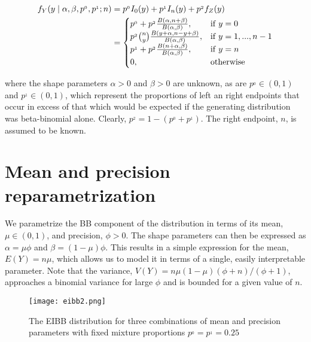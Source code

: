 \begin{equation}
\begin{split}
f_{Y}(y \mid \alpha , \beta , p^{_0}, p^{_1}; n)
&= p^{_0}I_0(y) + p^{_1}I_n(y) + p^{_2} f_{Z}(y)\\
&=	\begin{cases}
p^{_0} + p^{_2} {B(\alpha, n+\beta) \over B(\alpha,\beta)}, & \mathrm{if}\; y=0\\
p^{_2} {n \choose y} {B(y+\alpha, n-y+\beta) \over B(\alpha,\beta)}, & \mathrm{if}\; y=1,...,n-1\\
p^{_1} + p^{_2} {B(n+\alpha, \beta) \over B(\alpha,\beta)}, & \mathrm{if}\; y=n\\
0, & \mathrm{otherwise}
	\end{cases}
\end{split}
\label{densidad}
\end{equation}
	
\noindent where the shape parameters $\alpha > 0$ and $\beta > 0$ are unknown, as are $p^{_0} \in (0, 1)$ and $p^{_1} \in (0, 1)$, which represent the proportions of left an right endpoints that occur in excess of that which would be expected if the generating distribution was beta-binomial alone. Clearly, $p^{_2} = 1 -  (p^{_0}+p^{_1})$.  The right endpoint, $n$, is assumed to be known.\\

\section{Mean and precision reparametrization}
\label{sec:reparam}

We parametrize the BB component of the distribution in terms of its mean, $\mu \in (0,1)$, and precision, $\phi > 0$. The shape parameters can then be expressed as $\alpha = \mu\phi$ and $\beta = (1-\mu)\phi$. This results in a simple expression for the mean, $E(Y) = n\mu$, which allows us to model it in terms of a single, easily interpretable parameter. Note that the variance, $V(Y) = n\mu(1-\mu)(\phi+n)/(\phi+1)$, approaches a binomial variance for large $\phi$ and is bounded for a given value of $n$.\\

\begin{figure}
  \texttt{[image: eibb2.png]}
  \caption{The EIBB distribution for three combinations of mean and precision parameters with fixed mixture proportions $p^{_0} = p^{_1} = 0.25$}
  \label{fig:eibb}
\end{figure}

